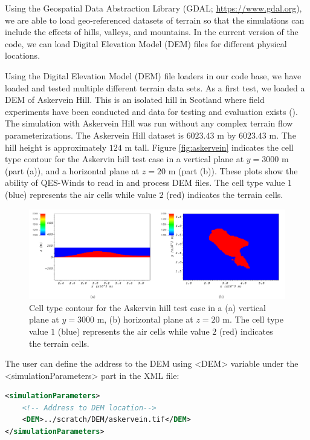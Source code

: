 Using the Geospatial Data Abstraction Library (GDAL; \href{https://www.gdal.org}{https://www.gdal.org}), we are able to load geo-referenced datasets of terrain so that the simulations can include the effects of hills, valleys, and mountains. In the current version of the code, we can load Digital Elevation Model (DEM) files for different physical locations.

Using the Digital Elevation Model (DEM) file loaders in our code base, we have loaded and tested multiple different terrain data sets. As a first test, we loaded a DEM of Askervein Hill. This is an isolated hill in Scotland where field experiments have been conducted and data for testing and evaluation exists (\cite{taylor1987askervein,mickle1988askervein}). The simulation with Askervein Hill was run without any complex terrain flow parameterizations. The Askervein Hill dataset is $6023.43$ m by $6023.43$ m. The hill height is approximately $124$ m tall. Figure \ref{fig:askervein} indicates the cell type contour for the Askervin hill test case in a vertical plane at $y = 3000$ m (part (a)), and a horizontal plane at $z=20$ m (part (b)). These plots show the ability of QES-Winds to read in and process DEM files. The cell type value $1$ (blue) represents the air cells while value $2$ (red) indicates the terrain cells.

\begin{figure}[h]
    \centering
    \includegraphics[width=\textwidth]{Images/askervein.pdf}
    \caption{Cell type contour for the Askervin hill test case in a (a) vertical plane at $y=3000$ m, (b) horizontal plane at $z=20$ m. The cell type value $1$ (blue) represents the air cells while value $2$ (red) indicates the terrain cells.}
\end{figure}

The user can define the address to the DEM using <DEM> variable under the <simulationParameters> part in the XML file:

\begin{lstlisting}[language=XML]
<simulationParameters>
	<!-- Address to DEM location-->
	<DEM>../scratch/DEM/askervein.tif</DEM>				
</simulationParameters>
\end{lstlisting}

